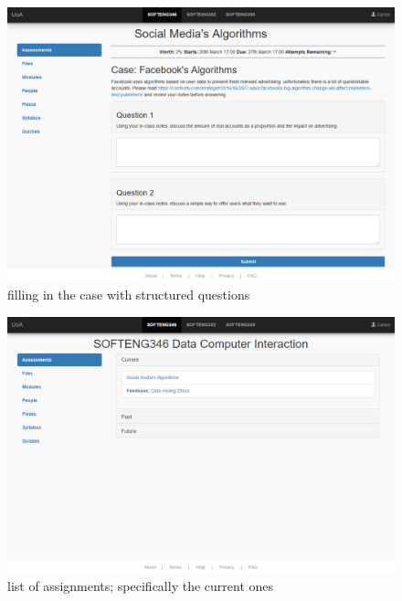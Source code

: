 \documentclass[10pt,a4paper]{article}
\begin{document}
	\begin{figure}[H]
		\centering
		\includegraphics[width=\textwidth]{1 - Social Medias Algorithms.PNG}
		\caption{filling in the case with structured questions}
		\label{fig:one}
	\end{figure}
	\begin{figure}[H]
		\centering
		\includegraphics[width=\textwidth]{2 - Assessments (Current).PNG}
		\caption{list of assignments; specifically the current ones}
		\label{fig:two}
	\end{figure}
\end{document}
